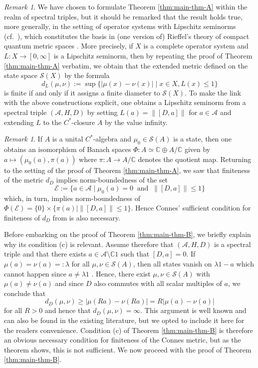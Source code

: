\documentclass[12pt,a4paper,twoside,reqno]{amsart}
\theoremstyle{plain}
\theoremstyle{definition}
\theoremstyle{remark} %
\newtheorem{remark}[theorem]{Remark}
\theoremstyle{plain}
\numberwithin{equation}{section}
\renewcommand{\leq}{\leqslant}
\renewcommand{\geq}{\geqslant}
\newcommand{\E}[1]{\emph{#1}}
\newcommand{\A}{{\mathcal{A}}}
\newcommand{\CC}{{\mathbb{C}}}
\renewcommand{\S}{{\mathcal{S}}}
\renewcommand{\E}{{\mathcal{E}}}
\begin{document}
\begin{remark}\label{rem:Lip-rem}
We have chosen to formulate Theorem  \ref{thm:main-thm-A} within the realm of spectral triples, but it should be remarked that the result holds true, more generally, in the setting of operator systems with Lipschitz seminorms (cf.~\cite[Definition 2.1]{KK:quantumSU2}), which constitutes the basis in (one version of) Rieffel's theory of compact quantum metric spaces \cite{Rie:MSS, Rie:CQM}. 
More precisely, if $X$ is a complete operator system and $L\colon X\to [0,\infty]$ is a Lipschitz seminorm, then by repeating the proof of Theorem \ref{thm:main-thm-A} verbatim, we obtain that  the extended metric defined on the state space $\S(X)$ by the formula
\[
d_L(\mu, \nu):=\sup\{|\mu(x)-\nu(x)| \mid x\in X, L(x)\leq 1\}
\]
is finite  if and only if it assigns a finite diameter to $\S(X)$.  To make the link with the above constructions explicit, one obtains a Lipschitz seminorm from a spectral triple $(\A,H, D)$ by setting $L(a)=\|[D,a]\|$ for $a\in \A$ and extending $L$ to the $C^*$-closure $A$ by the value infinity.

\end{remark}

\begin{remark}\label{rem:connes-criterion}
If $A$ is a unital $C^*$-algebra and $\mu_0\in \S(A)$ is a state, then one obtains an isomorphism of Banach spaces $\Phi\colon A\simeq \CC \oplus A/\CC$ given by $a\mapsto (\mu_0(a), \pi(a))$ where $\pi\colon A\to A/\CC$ denotes the quotient map.
Returning to the setting of the proof of Theorem \ref{thm:main-thm-A}, we saw that finiteness of the metric $d_D$ implies norm-boundedness of the set
\[
\E:=\{a\in \A \mid \mu_0(a)=0 \ \text{ and } \ \|[D,a]\|\leq 1 \}
\]
which, in turn, implies norm-boundedness of $\Phi(\E)=\{0\} \times \{\pi(a) \mid \|[D,a]\|\leq 1\}$.  Hence Connes' sufficient condition for finiteness of $d_D$ from \cite[Proposition 4]{Con:CFH} is also necessary. 
\end{remark}
Before embarking on the proof of Theorem  \ref{thm:main-thm-B}, we briefly explain why its condition (c) is relevant.  
Assume therefore that $(\A,H,  D)$ is a spectral triple and that there exists $a\in \A\setminus \CC 1$ such that $[D,a]=0$. If $\mu(a)=\nu(a)=:\lambda$ for all $\mu,\nu\in \S(A)$, then all states vanish on $\lambda 1-a$ which cannot happen since $a\neq \lambda 1$ \cite[Theorem 4.3.4]{KaRi:FTO}. Hence, there exist $\mu,\nu\in \S(A)$ with $\mu(a)\neq \nu(a)$ and since $D$ also commutes with all scalar multiples of $a$, we conclude that
\[
d_D(\mu, \nu) \geq |\mu(Ra)-\nu(Ra)|=R|\mu(a)-\nu(a)|
\]
for all $R>0$ and hence that $d_D(\mu,\nu)=\infty$.  This argument is well known and can also be found in the existing literature, but  we opted to include it here for the readers convenience.  Condition (c) of Theorem \ref{thm:main-thm-B} is therefore an obvious necessary condition for finiteness of the Connes metric, but as the theorem shows, this is not sufficient. We now proceed with the proof of Theorem \ref{thm:main-thm-B}. 
\end{document}
